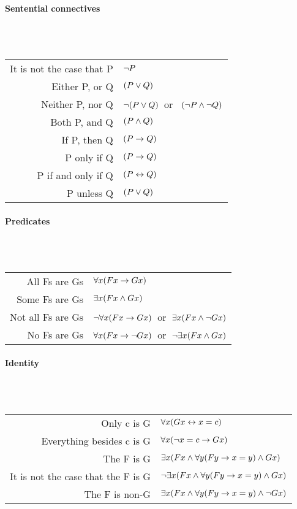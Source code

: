 \paragraph{Sentential connectives}~\\

\hspace{1cm}~\begin{tabular}{rl} \toprule
It is not the case that P & $\neg P$\\
Either P, or Q & $(P \vee Q)$\\
Neither P, nor Q & $\neg(P \vee Q)$\ or \ $(\neg P \wedge \neg Q)$\\
Both P, and Q & $(P \wedge Q)$\\
If P, then Q & $(P \rightarrow Q)$\\
P only if Q & $(P \rightarrow Q)$\\
P if and only if Q & $(P \leftrightarrow Q)$\\
P unless Q & $(P \vee Q)$\\
\bottomrule\end{tabular}

\paragraph{Predicates}~\\

\hspace{1cm}~\begin{tabular}{rl} \toprule
All Fs are Gs & $\forall x(Fx \rightarrow Gx)$\\
Some Fs are Gs & $\exists x(Fx \wedge Gx)$\\
Not all Fs are Gs & $\neg\forall x(Fx \rightarrow Gx)$\ or\ $\exists x(Fx \wedge \neg Gx)$\\
No Fs are Gs & $\forall x(Fx \rightarrow\neg Gx)$\ or\ $\neg\exists x(Fx \wedge Gx)$\\
\bottomrule\end{tabular}

\newpage\paragraph{Identity}~\\

\hspace{1cm}~\begin{tabular}{rl} \toprule
Only c is G & $\forall x(Gx \leftrightarrow x=c)$\\
Everything besides c is G & $\forall x(\neg x = c \rightarrow Gx)$\\
The F is G & $\exists x(Fx \wedge \forall y(Fy \rightarrow x=y) \wedge Gx)$\\
It is not the case that the F is G & $\neg\exists x(Fx \wedge \forall y(Fy \rightarrow x=y) \wedge Gx)$\\
The F is non-G & $\exists x(Fx \wedge \forall y(Fy \rightarrow x=y) \wedge \neg Gx)$\\\bottomrule
\end{tabular}

